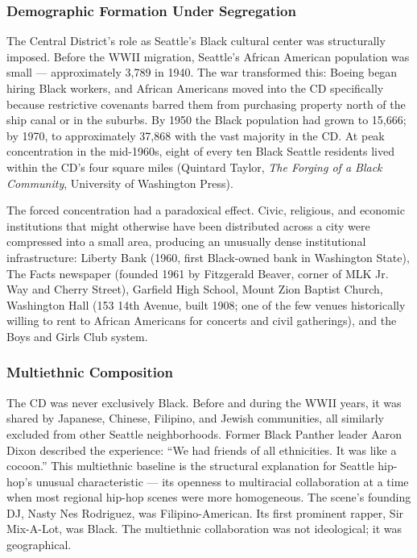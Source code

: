\documentclass[11pt,letterpaper]{article}
\begin{document}
\subsubsection{Demographic Formation Under Segregation}

The Central District's role as Seattle's Black cultural center was structurally imposed. Before the WWII migration, Seattle's African American population was small --- approximately 3,789 in 1940. The war transformed this: Boeing began hiring Black workers, and African Americans moved into the CD specifically because restrictive covenants barred them from purchasing property north of the ship canal or in the suburbs. By 1950 the Black population had grown to 15,666; by 1970, to approximately 37,868 with the vast majority in the CD. At peak concentration in the mid-1960s, eight of every ten Black Seattle residents lived within the CD's four square miles (Quintard Taylor, \textit{The Forging of a Black Community}, University of Washington Press).

The forced concentration had a paradoxical effect. Civic, religious, and economic institutions that might otherwise have been distributed across a city were compressed into a small area, producing an unusually dense institutional infrastructure: Liberty Bank (1960, first Black-owned bank in Washington State), The Facts newspaper (founded 1961 by Fitzgerald Beaver, corner of MLK Jr. Way and Cherry Street), Garfield High School, Mount Zion Baptist Church, Washington Hall (153 14th Avenue, built 1908; one of the few venues historically willing to rent to African Americans for concerts and civil gatherings), and the Boys and Girls Club system.

\subsubsection{Multiethnic Composition}

The CD was never exclusively Black. Before and during the WWII years, it was shared by Japanese, Chinese, Filipino, and Jewish communities, all similarly excluded from other Seattle neighborhoods. Former Black Panther leader Aaron Dixon described the experience: ``We had friends of all ethnicities. It was like a cocoon.'' This multiethnic baseline is the structural explanation for Seattle hip-hop's unusual characteristic --- its openness to multiracial collaboration at a time when most regional hip-hop scenes were more homogeneous. The scene's founding DJ, Nasty Nes Rodriguez, was Filipino-American. Its first prominent rapper, Sir Mix-A-Lot, was Black. The multiethnic collaboration was not ideological; it was geographical.
\end{document}
